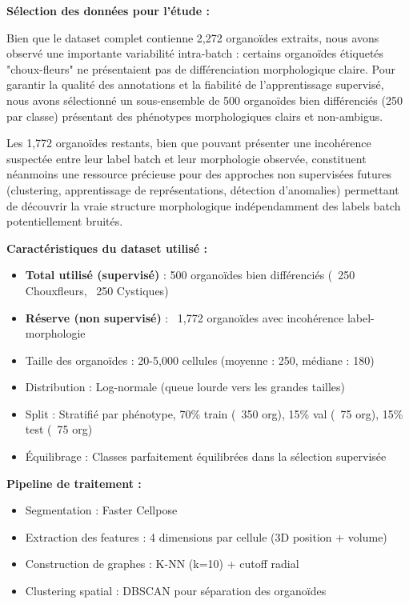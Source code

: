 \textbf{Sélection des données pour l'étude :}

Bien que le dataset complet contienne 2,272 organoïdes extraits, nous avons observé une importante variabilité intra-batch : certains organoïdes étiquetés "choux-fleurs" ne présentaient pas de différenciation morphologique claire. Pour garantir la qualité des annotations et la fiabilité de l'apprentissage supervisé, nous avons sélectionné un sous-ensemble de 500 organoïdes bien différenciés (250 par classe) présentant des phénotypes morphologiques clairs et non-ambigus.

Les 1,772 organoïdes restants, bien que pouvant présenter une incohérence suspectée entre leur label batch et leur morphologie observée, constituent néanmoins une ressource précieuse pour des approches non supervisées futures (clustering, apprentissage de représentations, détection d'anomalies) permettant de découvrir la vraie structure morphologique indépendamment des labels batch potentiellement bruités.

\textbf{Caractéristiques du dataset utilisé :}
\begin{itemize}
    \item \textbf{Total utilisé (supervisé)} : 500 organoïdes bien différenciés (~250 Chouxfleurs, ~250 Cystiques)
    \item \textbf{Réserve (non supervisé)} : ~1,772 organoïdes avec incohérence label-morphologie
    \item Taille des organoïdes : 20-5,000 cellules (moyenne : 250, médiane : 180)
    \item Distribution : Log-normale (queue lourde vers les grandes tailles)
    \item Split : Stratifié par phénotype, 70\% train (~350 org), 15\% val (~75 org), 15\% test (~75 org)
    \item Équilibrage : Classes parfaitement équilibrées dans la sélection supervisée
\end{itemize}

\textbf{Pipeline de traitement :}
\begin{itemize}
    \item Segmentation : Faster Cellpose
    \item Extraction des features : 4 dimensions par cellule (3D position + volume)
    \item Construction de graphes : K-NN (k=10) + cutoff radial
    \item Clustering spatial : DBSCAN pour séparation des organoïdes
\end{itemize}

